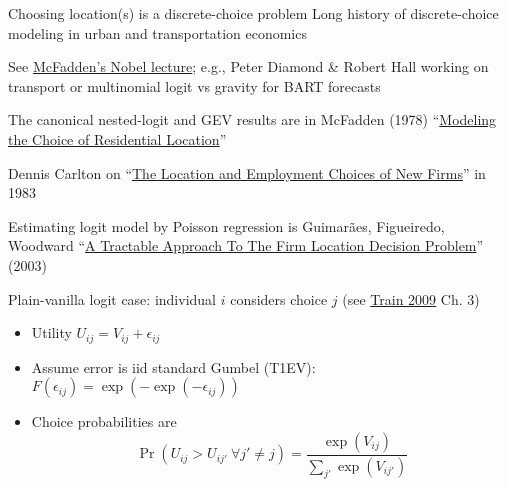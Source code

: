 \documentclass[11pt,notes=hide,aspectratio=169]{beamer}
\begin{document}
\begin{frame}{Choosing location(s) is a discrete-choice problem}
Long history of discrete-choice modeling in urban and transportation economics 
\begin{itemize}{\small 
\item See \href{https://www.nobelprize.org/uploads/2018/06/mcfadden-lecture.pdf}{McFadden's Nobel lecture}; e.g., Peter Diamond \& Robert Hall working on transport or multinomial logit vs gravity for BART forecasts
\item The canonical nested-logit and GEV results are in McFadden (1978) ``\href{https://trid.trb.org/view/87722}{Modeling the Choice of Residential Location}''
\item Dennis Carlton on ``\href{https://www.jstor.org/stable/1924189}{The Location and Employment Choices of New Firms}'' in 1983
\item {Estimating logit model by Poisson regression is Guimar{\~a}es, Figueiredo, Woodward ``\href{https://ideas.repec.org/a/tpr/restat/v85y2003i1p201-204.html}{A Tractable Approach To The Firm Location Decision Problem}'' (2003)\par}
}\end{itemize}
Plain-vanilla logit case:
individual $i$ considers choice $j$ (see \href{https://eml.berkeley.edu/books/choice2.html}{Train 2009} Ch. 3)
\begin{itemize}
	\item Utility $U_{ij} = V_{ij} + \epsilon_{ij}$
	\item Assume error is iid standard Gumbel (T1EV): $F\left(\epsilon_{ij}\right)=\exp(-\exp(-\epsilon_{ij}))$
	\item Choice probabilities are
	\begin{equation*}\Pr(U_{ij}>U_{ij'} \ \forall j' \neq j) = \frac{\exp(V_{ij})}{\sum_{j'}\exp(V_{ij'})} \end{equation*}
\end{itemize}
\end{frame}
\end{document}
